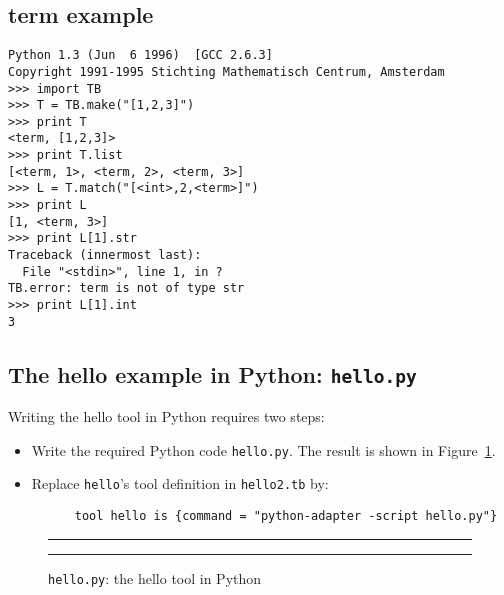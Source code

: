 \subsection{term example}
\begin{verbatim}
Python 1.3 (Jun  6 1996)  [GCC 2.6.3]
Copyright 1991-1995 Stichting Mathematisch Centrum, Amsterdam
>>> import TB
>>> T = TB.make("[1,2,3]")
>>> print T
<term, [1,2,3]>
>>> print T.list
[<term, 1>, <term, 2>, <term, 3>]
>>> L = T.match("[<int>,2,<term>]")
>>> print L
[1, <term, 3>]
>>> print L[1].str
Traceback (innermost last):
  File "<stdin>", line 1, in ?
TB.error: term is not of type str
>>> print L[1].int
3
\end{verbatim}

\subsection{\label{Ex-hello.py}The hello example in Python: {\tt hello.py}}

Writing the hello tool in Python requires two steps:
\begin{itemize}
\item Write the required Python code {\tt hello.py}. 
      The result is shown in Figure~\ref{fig:hello.py}.
\item Replace {\tt hello}'s tool definition in {\tt hello2.tb} by:
\begin{verbatim}
      tool hello is {command = "python-adapter -script hello.py"}
\end{verbatim}
\end{itemize}


\begin{figure}
\rule{\textwidth}{0.5mm}

  \caption{{\tt hello.py}: the hello tool in Python}
  \label{fig:hello.py}
\rule{\textwidth}{0.5mm}
\end{figure}
